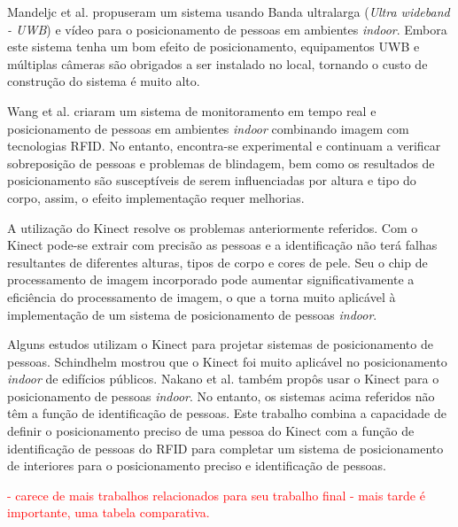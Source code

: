 Mandeljc et al. \cite{mandeljc2012tracking} propuseram um sistema usando Banda ultralarga (\textit{Ultra wideband - UWB}) e vídeo para o posicionamento de pessoas em ambientes \textit{indoor}. Embora este sistema tenha um bom efeito de posicionamento, equipamentos UWB e múltiplas câmeras são obrigados a ser instalado no local, tornando o custo de construção do sistema é muito alto.

Wang et al. \cite{wang2011flexible,wang2011rfid} criaram um sistema de monitoramento em tempo real e posicionamento de pessoas em ambientes \textit{indoor} combinando imagem com  tecnologias RFID. No entanto, encontra-se experimental e continuam a verificar sobreposição de pessoas e problemas de blindagem, bem como os resultados de posicionamento são susceptíveis de serem influenciadas por altura e tipo do corpo, assim, o efeito implementação requer melhorias.

A utilização do Kinect resolve os problemas anteriormente referidos. Com o Kinect pode-se extrair com precisão as pessoas e a identificação não terá falhas resultantes de diferentes alturas, tipos de corpo e cores de pele. Seu o chip de processamento de imagem incorporado pode aumentar significativamente a eficiência do processamento de imagem, o que a torna muito aplicável à implementação de um sistema de posicionamento de pessoas \textit{indoor}.

Alguns estudos utilizam o Kinect para projetar sistemas de posicionamento de pessoas. Schindhelm \cite{schindhelm2012evaluating} mostrou que o Kinect foi muito aplicável no posicionamento \textit{indoor} de edifícios públicos. Nakano et al. \cite{nakano2012kinect} também propôs usar o Kinect para o posicionamento de pessoas \textit{indoor}. No entanto, os sistemas acima referidos não têm a função de identificação de pessoas. Este trabalho combina a capacidade de definir o posicionamento preciso de uma pessoa do Kinect com a função de identificação de pessoas do RFID para completar um sistema de posicionamento de interiores para o posicionamento preciso e identificação de pessoas.

\textcolor{red}{- carece de mais trabalhos relacionados para seu trabalho final - mais tarde é importante, uma tabela comparativa.}